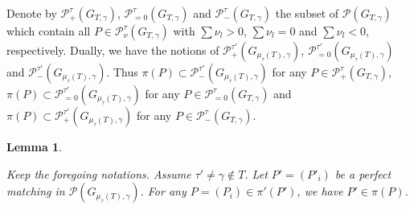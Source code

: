 \documentclass[10pt]{amsart}
\theoremstyle{theorems}
\newtheorem{Lemma}[Theorem]{Lemma}
\begin{document}
%
%
%
%
%
%
%
%
%
%
%
%
%

Denote by $\mathcal P^{\tau}_{+}(G_{T,\gamma})$, $\mathcal P^{\tau}_{=0}(G_{T,\gamma})$ and $\mathcal P^{\tau}_{-}(G_{T,\gamma})$ the subset of $\mathcal P(G_{T,\gamma})$ which contain all $P\in \mathcal P^{\tau}_{\nu}(G_{T,\gamma})$ with $\sum \nu_l>0$, $\sum \nu_l=0$ and $\sum \nu_l<0$, respectively. Dually, we have the notions of $\mathcal P^{\tau'}_{+}(G_{\mu_{\tau}(T),\gamma})$, $\mathcal P^{\tau'}_{=0}(G_{\mu_{\tau}(T),\gamma})$ and $\mathcal P^{\tau'}_{-}(G_{\mu_{\tau}(T),\gamma})$. Thus $\pi(P)\subset \mathcal P^{\tau'}_{-}(G_{\mu_{\tau}(T),\gamma})$ for any $P\in \mathcal P^{\tau}_{+}(G_{T,\gamma})$, $\pi(P)\subset \mathcal P^{\tau'}_{=0}(G_{\mu_{\tau}(T),\gamma})$ for any $P\in \mathcal P^{\tau}_{=0}(G_{T,\gamma})$ and $\pi(P)\subset \mathcal P^{\tau'}_{+}(G_{\mu_{\tau}(T),\gamma})$ for any $P\in \mathcal P^{\tau}_{-}(G_{T,\gamma})$.

\medskip

\begin{Lemma}\label{retraction}

Keep the foregoing notations. Assume $\tau'\neq \gamma\notin T$. Let $P'=(P'_i)$ be a perfect matching in $\mathcal P(G_{\mu_{\tau}(T),\gamma})$. For any $P=(P_i)\in \pi'(P')$, we have $P'\in \pi(P)$.

\end{Lemma}
\end{document}
